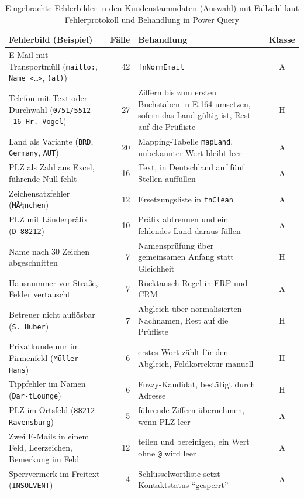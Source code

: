 \documentclass[a4paper,12pt]{article}
\newcommand{\pq}[1]{\texttt{#1}}        %
\begin{document}
\begin{table}[H]
  \centering\scriptsize
  \caption{Eingebrachte Fehlerbilder in den Kundenstammdaten (Auswahl) mit Fallzahl laut Fehlerprotokoll und Behandlung in Power Query}
  \label{tab:fehlerbilder}
  \begin{tabular}{@{}>{\raggedright\arraybackslash}p{4.4cm}r>{\raggedright\arraybackslash}p{7.3cm}c@{}}
    \toprule
    Fehlerbild (Beispiel) & Fälle & Behandlung & Klasse \\
    \midrule
    E-Mail mit Transportmüll (\texttt{mailto:}, \texttt{Name <\dots>}, \texttt{(at)}) & 42 & \pq{fnNormEmail} & A \\
    Telefon mit Text oder Durchwahl (\texttt{0751/5512 -16 Hr.\ Vogel}) & 27 & Ziffern bis zum ersten Buchstaben in E.164 umsetzen, sofern das Land gültig ist, Rest auf die Prüfliste & H \\
    Land als Variante (\texttt{BRD}, \texttt{Germany}, \texttt{AUT}) & 20 & Mapping-Tabelle \pq{mapLand}, unbekannter Wert bleibt leer & A \\
    PLZ als Zahl aus Excel, führende Null fehlt & 16 & Text, in Deutschland auf fünf Stellen auffüllen & A \\
    Zeichensatzfehler (\texttt{MÃ¼nchen}) & 12 & Ersetzungsliste in \pq{fnClean} & A \\
    PLZ mit Länderpräfix (\texttt{D-88212}) & 10 & Präfix abtrennen und ein fehlendes Land daraus füllen & A \\
    Name nach 30 Zeichen abgeschnitten & 7 & Namensprüfung über gemeinsamen Anfang statt Gleichheit & H \\
    Hausnummer vor Straße, Felder vertauscht & 7 & Rücktausch-Regel in ERP und CRM & A \\
    Betreuer nicht auflösbar (\texttt{S.\ Huber}) & 7 & Abgleich über normalisierten Nachnamen, Rest auf die Prüfliste & H \\
    Privatkunde nur im Firmenfeld (\texttt{Müller Hans}) & 6 & erstes Wort zählt für den Abgleich, Feldkorrektur manuell & H \\
    Tippfehler im Namen (\texttt{Dar-tLounge}) & 6 & Fuzzy-Kandidat, bestätigt durch Adresse & H \\
    PLZ im Ortsfeld (\texttt{88212 Ravensburg}) & 5 & führende Ziffern übernehmen, wenn PLZ leer & A \\
    Zwei E-Mails in einem Feld, Leerzeichen, Bemerkung im Feld & 12 & teilen und bereinigen, ein Wert ohne \texttt{@} wird leer & A \\
    Sperrvermerk im Freitext (\texttt{INSOLVENT}) & 4 & Schlüsselwortliste setzt Kontaktstatus \enquote{gesperrt} & A \\

\end{tabular}
\end{table}
\end{document}
